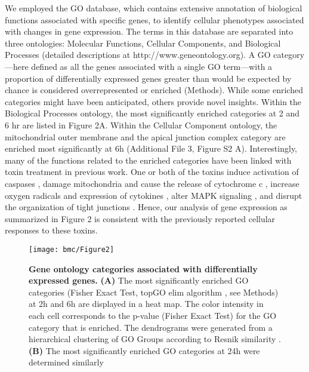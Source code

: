 We employed the GO database, which contains extensive annotation of biological functions associated with specific genes, to identify cellular phenotypes associated with changes in gene expression. The terms in this database are separated into three ontologies: Molecular Functions, Cellular Components, and Biological Processes (detailed descriptions at http://www.geneontology.org). A GO category—here defined as all the genes associated with a single GO term—with a proportion of differentially expressed genes greater than would be expected by chance is considered overrepresented or enriched (Methods). While some enriched categories might have been anticipated, others provide novel insights. Within the Biological Processes ontology, the most significantly enriched categories at 2 and 6 hr are listed in Figure 2A. Within the Cellular Component ontology, the mitochondrial outer membrane and the apical junction complex category are enriched most significantly at 6h (Additional File 3, Figure S2 A). Interestingly, many of the functions related to the enriched categories have been linked with toxin treatment in previous work. One or both of the toxins induce activation of caspases \cite{Gerhard:2008wz, QaaposDan:2002uj, Carneiro:2006cw, Brito:2002ky}, damage mitochondria and cause the release of cytochrome c \cite{Matarrese:2007ix, He:2000uc}, increase oxygen radicals and expression of cytokines \cite{He:2002cl,Qiu:1999us,Flegel:1991ws}, alter MAPK signaling \cite{Meyer:2007kj,Lee:2007gj,Na:2005bx}, and disrupt the organization of tight junctions \cite{Nusrat:2001cs}. Hence, our analysis of gene expression as summarized in Figure 2 is consistent with the previously reported cellular responses to these toxins.

\begin{figure}[h!]
  \centering
  \texttt{[image: bmc/Figure2]}
  \caption[Gene ontology categories associated with differentially expressed genes]{
  \textbf{Gene ontology categories associated with differentially expressed genes.}
  \textbf{(A)} The most significantly enriched GO categories (Fisher Exact Test, topGO elim algorithm \cite{Alexa:2006hg}, see Methods) at 2h and 6h are displayed in a heat map. The color intensity in each cell corresponds to the p-value (Fisher Exact Test) for the GO category that is enriched. The dendrograms were generated from a hierarchical clustering of GO Groups according to Resnik similarity \cite{Resnik:1999jl}.
\textbf{(B)} The most significantly enriched GO categories at 24h were determined similarly
}
  \label{bmc:fig2}
\end{figure}


